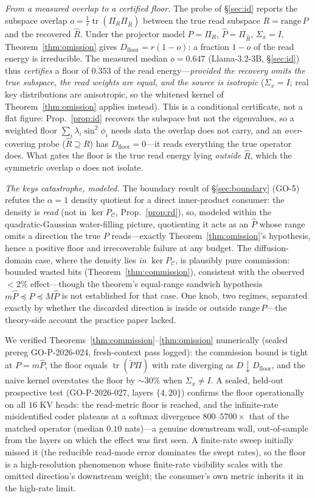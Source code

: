 \documentclass[11pt]{article}
\theoremstyle{definition}
\theoremstyle{remark}
\newcommand{\PC}{P_{\mathcal{C}}}
\newcommand{\tr}{\operatorname{tr}}
\begin{document}
\emph{From a measured overlap to a certified floor.} The probe of \S\ref{sec:id} reports
the subspace overlap $o=\tfrac1r\tr(\Pi_R\Pi_{\hat R})$ between the true read subspace
$R=\mathrm{range}\,P$ and the recovered $\hat R$. Under the projector model $P=\Pi_R$,
$\hat P=\Pi_{\hat R}$, $\Sigma_x=I$, Theorem~\ref{thm:omission} gives
$D_{\mathrm{floor}}=r(1-o)$: a fraction $1-o$ of the read energy is irreducible. The
measured median $o=0.647$ (Llama-3.2-3B, \S\ref{sec:id}) thus \emph{certifies} a floor of
$0.353$ of the read energy---\emph{provided the recovery omits the true subspace, the read
weights are equal, and the source is isotropic} ($\Sigma_x=I$; real key distributions are
anisotropic, so the whitened kernel of Theorem~\ref{thm:omission} applies instead). This
is a conditional certificate, not a flat figure:
Prop.~\ref{prop:id} recovers the subspace but not the eigenvalues, so a weighted floor
$\sum_i\lambda_i\sin^2\phi_i$ needs data the overlap does not carry, and an
\emph{over}-covering probe ($\hat R\supseteq R$) has $D_{\mathrm{floor}}=0$---it reads
everything the true operator does. What gates the floor is the true read energy lying
\emph{outside} $\hat R$, which the symmetric overlap $o$ does not isolate.

\emph{The keys catastrophe, modeled.} The boundary result of \S\ref{sec:boundary} (GO-5)
refutes the $\alpha=1$ density quotient for a direct inner-product consumer: the density is
\emph{read} (not in $\ker\PC$, Prop.~\ref{prop:rd}), so, modeled within the
quadratic-Gaussian water-filling picture, quotienting it acts as an $\hat P$ whose range
omits a direction the true $P$ reads---exactly Theorem~\ref{thm:omission}'s hypothesis,
hence a positive floor and irrecoverable failure at any budget. The diffusion-domain case,
where the density lies \emph{in} $\ker\PC$, is plausibly pure commission: bounded wasted
bits (Theorem~\ref{thm:commission}), consistent with the observed $<2\%$ effect---though
the theorem's equal-range sandwich hypothesis $m\hat P\preceq P\preceq M\hat P$ is not
established for that case. One knob, two regimes, separated exactly by whether the discarded direction is
inside or outside $\mathrm{range}\,P$---the theory-side account the practice paper lacked.

We verified Theorems~\ref{thm:commission}--\ref{thm:omission} numerically (sealed prereg
GO-P-2026-024, fresh-context pass logged): the commission bound is tight at $P=m\hat P$,
the floor equals $\tr(\tilde P\Pi)$ with rate diverging as $D\downarrow
D_{\mathrm{floor}}$, and the naive kernel overstates the floor by ${\sim}30\%$ when
$\Sigma_x\ne I$. A sealed, held-out prospective test (GO-P-2026-027, layers $\{4,20\}$) confirms the floor
operationally on all $16$ KV heads: the read-metric floor is reached, and the infinite-rate
misidentified coder plateaus at a softmax divergence $800$--$5700\times$ that of the matched
operator (median $0.10$ nats)---a genuine downstream wall, out-of-sample from the layers on
which the effect was first seen. A finite-rate sweep initially missed it (the reducible
read-mode error dominates the swept rates), so the floor is a high-resolution phenomenon
whose finite-rate visibility scales with the omitted direction's downstream weight; the
consumer's own metric inherits it in the high-rate limit.
\end{document}
